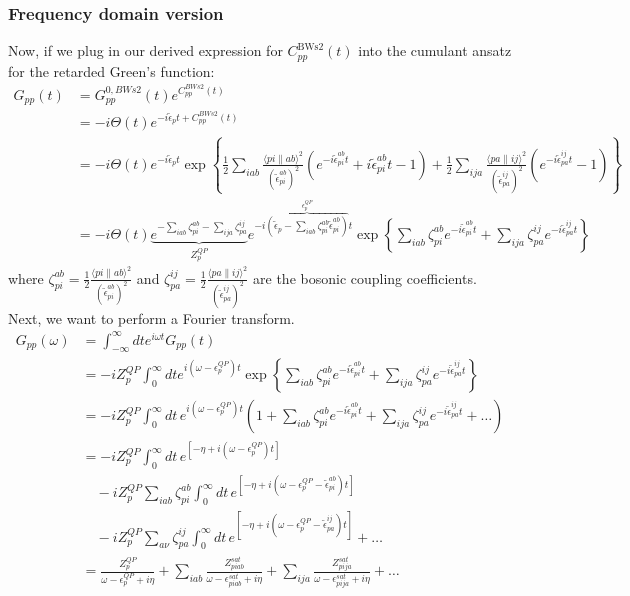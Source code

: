 \subsubsection{Frequency domain version}
Now, if we plug in our derived expression for $C^{\text{BWs2}}_{pp}(t)$ into the cumulant ansatz for the retarded Green's function:
\begin{align}
G_{pp}(t) & = G_{pp}^{0, BWs2}(t) e^{C_{pp}^{BWs2}(t)} \\
& = -i \Theta(t) e^{-i \tilde\epsilon_pt + C_{pp}^{BWs2}(t)} \\
& = -i \Theta(t) e^{-i \tilde\epsilon_pt} \exp\left\{ \frac{1}{2} \sum_{i a b}\frac{\langle p i \| a b\rangle^2 }{\left(\tilde{\epsilon}_{p i}^{a b}\right)^2}\left(e^{-i \tilde{\epsilon}_{p i}^{a b} t} +i \tilde{\epsilon}_{p i}^{a b} t -1 \right) + \frac{1}{2}\sum_{i j a} \frac{\langle p a \| i j\rangle^2}{\left(\tilde{\epsilon}_{p a}^{i j}\right)^2} \left(e^{-i \tilde{\epsilon}_{p a}^{i j} t} - 1 \right) \right\} \\
&= -i \Theta(t) \underbrace{e^{-\sum_{i a b} \zeta_{pi}^{ab} - \sum_{i j a} \zeta_{pa}^{ij}}}_{Z_p^{QP}} e^{-i\overbrace{\left(\tilde\epsilon_p - \sum_{i a b} \zeta_{pi}^{ab} \tilde{\epsilon}_{pi}^{ab}\right)}^{\epsilon_p^{QP}} t} \exp\left\{ \sum_{i a b} \zeta_{pi}^{ab} e^{-i\tilde\epsilon_{pi}^{ab} t} + \sum_{i j a} \zeta_{pa}^{ij} e^{-i\tilde\epsilon_{pa}^{ij} t} \right\}
\end{align}
where $\zeta_{pi}^{ab} = \frac{1}{2} \frac{\langle p i \| a b\rangle^2}{\left(\tilde{\epsilon}_{p i}^{a b}\right)^2}$ and $\zeta_{pa}^{ij} = \frac{1}{2} \frac{\langle p a \| i j\rangle^2}{\left(\tilde{\epsilon}_{p a}^{i j}\right)^2}$ are the bosonic coupling coefficients.
 Next, we want to perform a Fourier transform.
\begin{align}
G_{pp}(\omega) & = \int_{-\infty}^{\infty} dt e^{i \omega t} G_{pp}(t)
\label{Gpp1}
\\
& = -i Z_p^{QP} \int_0^{\infty} dt e^{i(\omega - \epsilon_p^{QP}) t} \exp\left\{ \sum_{i a b} \zeta_{pi}^{ab} e^{-i\tilde\epsilon_{pi}^{ab} t} + \sum_{i j a} \zeta_{pa}^{ij} e^{-i\tilde\epsilon_{pa}^{ij} t} \right\}
\label{Gpp2}
\\
& = -i Z_p^{QP} \int_0^{\infty} dt\, e^{i(\omega - \epsilon_p^{QP}) t} \left(1 + \sum_{i a b} \zeta_{pi}^{ab} e^{-i\tilde\epsilon_{pi}^{ab} t} + \sum_{i j a} \zeta_{pa}^{ij} e^{-i\tilde\epsilon_{pa}^{ij} t} + \ldots \right) \\
&= -i Z_p^{QP} \int_0^{\infty} dt\, e^{[-\eta + i(\omega - \epsilon_p^{QP}) t]}\label{Gpp3} \\
&\quad - i Z_p^{QP} \sum_{iab} \zeta_{pi}^{ab} \int_0^{\infty} dt\, e^{[-\eta + i(\omega - \epsilon_p^{QP} - \tilde\epsilon_{pi}^{ab}) t]}\\
&\quad - i Z_p^{QP} \sum_{a\nu} \zeta_{pa}^{ij} \int_0^{\infty} dt\, e^{[-\eta + i(\omega - \epsilon_p^{QP} - \tilde\epsilon_{pa}^{ij}) t]} + \ldots\\
&= \frac{Z_p^{QP}}{\omega - \epsilon_p^{QP} + i\eta} + \sum_{i a b} \frac{Z_{piab}^{sat}}{\omega - \epsilon_{piab}^{sat} + i\eta} + \sum_{i j a} \frac{Z_{pija}^{sat}}{\omega - \epsilon_{pija}^{sat} + i\eta} + \ldots
\end{align}
